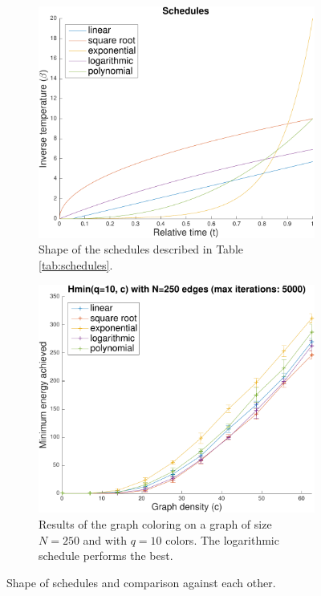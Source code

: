 \documentclass{article}
\begin{document}
\begin{figure}[h]
\centering
\begin{subfigure}[t]{.5\linewidth}
  \centering
  \includegraphics[width=.8\linewidth]{figures/schedules_shape.pdf}
  \caption{Shape of the schedules described in Table \ref{tab:schedules}.}
  \label{fig:schedules_shape}
\end{subfigure}%
\begin{subfigure}[t]{.5\linewidth}
  \centering
  \includegraphics[width=.8\linewidth]{figures/schedules_evaluation.pdf}
  \caption{Results of the graph coloring on a graph of size $N=250$ and with $q=10$ colors. The logarithmic schedule performs the best.}
  \label{fig:schedules_evaluation}
\end{subfigure}
\caption{Shape of schedules and comparison against each other.}
\label{fig:schedules}
\end{figure}
\end{document}
